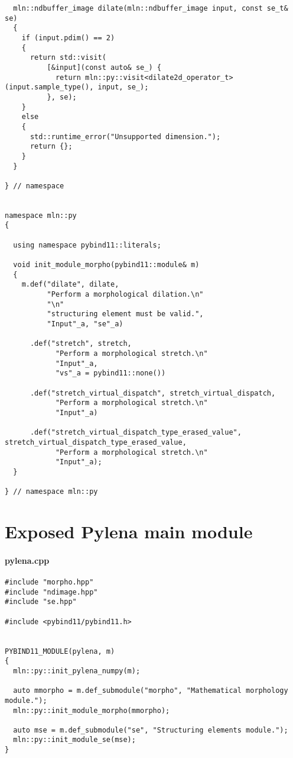 \begin{verbatim}
  mln::ndbuffer_image dilate(mln::ndbuffer_image input, const se_t& se)
  {
    if (input.pdim() == 2)
    {
      return std::visit(
          [&input](const auto& se_) {
            return mln::py::visit<dilate2d_operator_t>(input.sample_type(), input, se_);
          }, se);
    }
    else
    {
      std::runtime_error("Unsupported dimension.");
      return {};
    }
  }

} // namespace


namespace mln::py
{

  using namespace pybind11::literals;

  void init_module_morpho(pybind11::module& m)
  {
    m.def("dilate", dilate,
          "Perform a morphological dilation.\n"
          "\n"
          "structuring element must be valid.",
          "Input"_a, "se"_a)

      .def("stretch", stretch,
            "Perform a morphological stretch.\n"
            "Input"_a,
            "vs"_a = pybind11::none())

      .def("stretch_virtual_dispatch", stretch_virtual_dispatch,
            "Perform a morphological stretch.\n"
            "Input"_a)

      .def("stretch_virtual_dispatch_type_erased_value", stretch_virtual_dispatch_type_erased_value,
            "Perform a morphological stretch.\n"
            "Input"_a);
  }

} // namespace mln::py
\end{verbatim}


\clearpage

\section{Exposed Pylena main module}
\label{appendix:static-dynamic-bridge.pylena}

\paragraph{pylena.cpp}
\label{appendix:static-dynamic-bridge.pylena.cpp}

\begin{verbatim}
#include "morpho.hpp"
#include "ndimage.hpp"
#include "se.hpp"

#include <pybind11/pybind11.h>


PYBIND11_MODULE(pylena, m)
{
  mln::py::init_pylena_numpy(m);

  auto mmorpho = m.def_submodule("morpho", "Mathematical morphology module.");
  mln::py::init_module_morpho(mmorpho);

  auto mse = m.def_submodule("se", "Structuring elements module.");
  mln::py::init_module_se(mse);
}
\end{verbatim}


